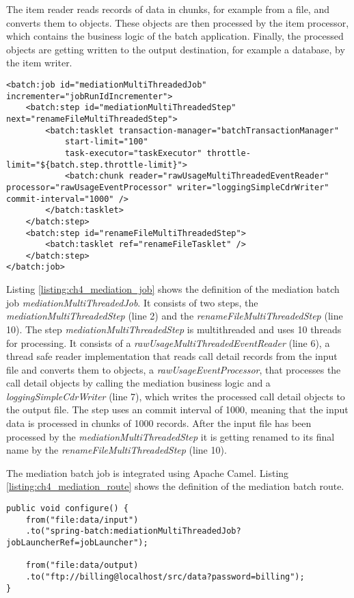 The item reader reads records of data in chunks, for example from a file, and converts them to objects. These objects are then processed by the item processor, which contains the business logic of the batch application. Finally, the processed objects are getting written to the output destination, for example a database, by the item writer.

\begin{lstlisting}[caption={Mediation batch job definition},label=listing:ch4_mediation_job]
<batch:job id="mediationMultiThreadedJob" incrementer="jobRunIdIncrementer">
	<batch:step id="mediationMultiThreadedStep" next="renameFileMultiThreadedStep">
		<batch:tasklet transaction-manager="batchTransactionManager"
			start-limit="100" 
			task-executor="taskExecutor" throttle-limit="${batch.step.throttle-limit}">
			<batch:chunk reader="rawUsageMultiThreadedEventReader" processor="rawUsageEventProcessor" writer="loggingSimpleCdrWriter" commit-interval="1000" />
		</batch:tasklet>
	</batch:step>
	<batch:step id="renameFileMultiThreadedStep">
		<batch:tasklet ref="renameFileTasklet" />
	</batch:step>
</batch:job>
\end{lstlisting}

Listing \ref{listing:ch4_mediation_job} shows the definition of the mediation batch job \emph{mediationMultiThreadedJob}. It consists of two steps, the \emph{mediationMultiThreadedStep} (line 2) and the \emph{renameFileMultiThreadedStep} (line 10). The step \emph{mediationMultiThreadedStep} is multithreaded and uses 10 threads for processing. It consists of a \emph{rawUsageMultiThreadedEventReader} (line 6), a thread safe reader implementation that reads call detail records from the input file and converts them to objects, a \emph{rawUsageEventProcessor}, that processes the call detail objects by calling the mediation business logic and a \emph{loggingSimpleCdrWriter} (line 7), which writes the processed call detail objects to the output file. The step uses an commit interval of 1000, meaning that the input data is processed in chunks of 1000 records. After the input file has been processed by the \emph{mediationMultiThreadedStep} it is getting renamed to its final name by the \emph{renameFileMultiThreadedStep} (line 10).

The mediation batch job is integrated using Apache Camel. Listing \ref{listing:ch4_mediation_route} shows the definition of the mediation batch route.

\begin{lstlisting}[caption={Mediation batch route definition},label=listing:ch4_mediation_route]
public void configure() {
	from("file:data/input")
	.to("spring-batch:mediationMultiThreadedJob?jobLauncherRef=jobLauncher");
        
	from("file:data/output)
	.to("ftp://billing@localhost/src/data?password=billing");
}
\end{lstlisting}

